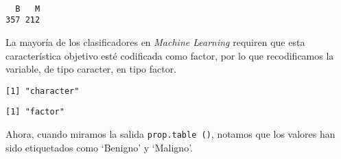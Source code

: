 \documentclass[
]{article}
\newenvironment{Shaded}{\begin{snugshade}}{\end{snugshade}}
\newcommand{\CommentTok}[1]{\textcolor[rgb]{0.56,0.35,0.01}{\textit{#1}}}
\newcommand{\DataTypeTok}[1]{\textcolor[rgb]{0.13,0.29,0.53}{#1}}
\newcommand{\DecValTok}[1]{\textcolor[rgb]{0.00,0.00,0.81}{#1}}
\newcommand{\KeywordTok}[1]{\textcolor[rgb]{0.13,0.29,0.53}{\textbf{#1}}}
\newcommand{\NormalTok}[1]{#1}
\newcommand{\OperatorTok}[1]{\textcolor[rgb]{0.81,0.36,0.00}{\textbf{#1}}}
\newcommand{\StringTok}[1]{\textcolor[rgb]{0.31,0.60,0.02}{#1}}
\begin{document}
\begin{verbatim}

  B   M 
357 212 
\end{verbatim}

La mayoría de los clasificadores en \emph{Machine Learning} requiren que
esta característica objetivo esté codificada como factor, por lo que
recodificamos la variable, de tipo caracter, en tipo factor.

\begin{Shaded}
\end{Shaded}

\begin{verbatim}
[1] "character"
\end{verbatim}

\begin{Shaded}
\end{Shaded}

\begin{verbatim}
[1] "factor"
\end{verbatim}

Ahora, cuando miramos la salida \texttt{prop.table\ ()}, notamos que los
valores han sido etiquetados como `Benigno' y `Maligno'.

\begin{Shaded}
\end{Shaded}
\end{document}
